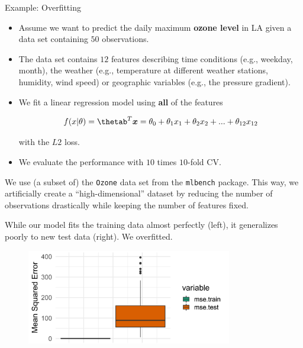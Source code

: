 \begin{vbframe}{Example: Overfitting}

\begin{itemize}
\item Assume we want to predict the daily maximum \textbf{ozone level} in LA given a data set containing $50$ observations.
\item The data set contains $12$ features describing time conditions (e.g., weekday, month),
the weather (e.g., temperature at different weather stations, humidity, wind speed) or geographic variables (e.g., the pressure gradient).
\item We fit a linear regression model using \textbf{all} of the features

$$
\fxt = \thetab^T\xv = \theta_0 + \theta_1 x_1 + \theta_2 x_2 + ... + \theta_{12} x_{12}
$$

with the $L2$ loss.

\item We evaluate the performance with $10$ times $10$-fold CV.

\end{itemize}

\vfill

\begin{footnotesize} 
We use (a subset of) the \texttt{Ozone} data set from the \texttt{mlbench} package. This way, we artificially create a \enquote{high-dimensional} dataset by reducing the number of observations drastically while keeping the number of features fixed. 
\end{footnotesize}

\framebreak 


While our model fits the training data almost perfectly (left), it generalizes poorly
to new test data (right). We overfitted.

\lz 

\begin{figure}
\includegraphics[width=0.8\textwidth]{figure_man/example01.png}\\
\end{figure}

\end{vbframe}


